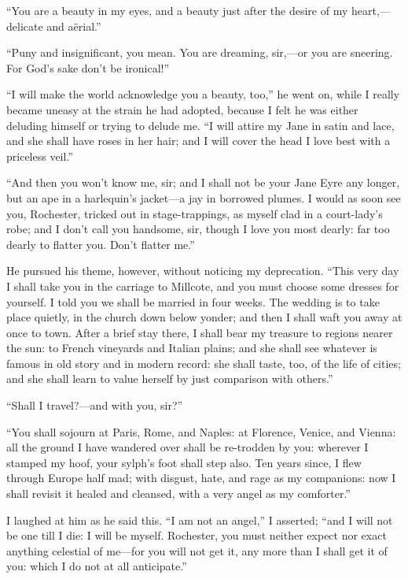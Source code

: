 \enquote{You are a beauty in my eyes, and a beauty just after the desire
	of my heart,---delicate and aërial.}

\enquote{Puny and insignificant, you mean.  You are dreaming, sir,---or
	you are sneering.  For God's sake don't be ironical!}

\enquote{I will make the world acknowledge you a beauty, too,} he went
on, while I really became uneasy at the strain he had adopted, because I
felt he was either deluding himself or trying to delude me.  \enquote{I
	will attire my Jane in satin and lace, and she shall have roses in her
	hair; and I will cover the head I love best with a priceless veil.}

\enquote{And then you won't know me, sir; and I shall not be your Jane
	Eyre any longer, but an ape in a harlequin's jacket---a jay in borrowed
	plumes.  I would as soon see you, \Mr{} Rochester, tricked out in
	stage-trappings, as myself clad in a court-lady's robe; and I don't call
	you handsome, sir, though I love you most dearly: far too dearly to
	flatter you.  Don't flatter me.}

He pursued his theme, however, without noticing my deprecation.
\enquote{This very day I shall take you in the carriage to Millcote, and
	you must choose some dresses for yourself.  I told you we shall be
	married in four weeks.  The wedding is to take place quietly, in the
	church down below yonder; and then I shall waft you away at once to
	town.  After a brief stay there, I shall bear my treasure to regions
	nearer the sun: to French vineyards and Italian plains; and she shall
	see whatever is famous in old story and in modern record: she shall
	taste, too, of the life of cities; and she shall learn to value herself
	by just comparison with others.}

\enquote{Shall I travel?---and with you, sir?}

\enquote{You shall sojourn at Paris, Rome, and Naples: at Florence,
	Venice, and Vienna: all the ground I have wandered over shall be
	re-trodden by you: wherever I stamped my hoof, your sylph's foot shall
	step also.  Ten years since, I flew through Europe half mad; with
	disgust, hate, and rage as my companions: now I shall revisit it healed
	and cleansed, with a very angel as my comforter.}

I laughed at him as he said this.  \enquote{I am not an angel,} I
asserted; \enquote{and I will not be one till I die: I will be myself.
	\Mr{} Rochester, you must neither expect nor exact anything celestial of
	me---for you will not get it, any more than I shall get it of you: which
	I do not at all anticipate.}

